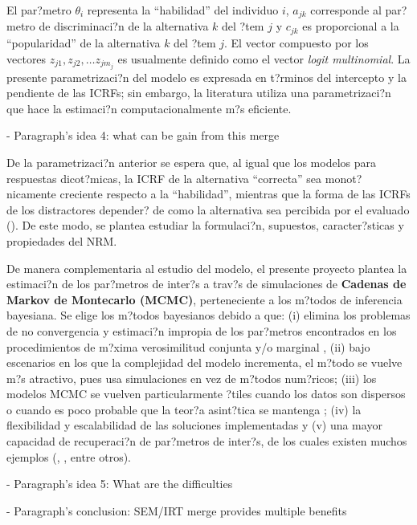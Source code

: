 El par?metro $\theta_i$ representa la ``habilidad'' del individuo $i$, $a_{jk}$ corresponde al par?metro de discriminaci?n de la alternativa $k$ del ?tem $j$ y $c_{jk}$ es proporcional a la ``popularidad'' de la alternativa $k$ del ?tem $j$. El vector compuesto por los vectores $z_{j1}, z_{j2}, \dots z_{j m_j}$ es usualmente definido como el vector \textit{logit multinomial}. La presente parametrizaci?n del modelo es expresada en t?rminos del intercepto y la pendiente de las ICRFs; sin embargo, la literatura utiliza una parametrizaci?n que hace la estimaci?n computacionalmente m?s eficiente.



- Paragraph's idea 4: what can be gain from this merge

De la parametrizaci?n anterior se espera que, al igual que los modelos para respuestas dicot?micas, la ICRF de la alternativa ``correcta'' sea monot?nicamente creciente respecto a la ``habilidad'', mientras que la forma de las ICRFs de los distractores depender? de como la alternativa sea percibida por el evaluado (\citealp{Ham_Swam1991}). De este modo, se plantea estudiar la formulaci?n, supuestos, caracter?sticas y propiedades del NRM.

De manera complementaria al estudio del modelo, el presente proyecto plantea la estimaci?n de los par?metros de inter?s a trav?s de simulaciones de \textbf{Cadenas de Markov de Montecarlo (MCMC)}, perteneciente a los m?todos de inferencia bayesiana. Se elige los m?todos bayesianos debido a que: (i) elimina los problemas de no convergencia y estimaci?n impropia de los par?metros encontrados en los procedimientos de m?xima verosimilitud conjunta y/o marginal \citep{Ham_Swam_Rog1991}, (ii) bajo escenarios en los que la complejidad del modelo incrementa, el m?todo se vuelve m?s atractivo, pues usa simulaciones en vez de m?todos num?ricos; (iii) los modelos MCMC se vuelven particularmente ?tiles cuando los datos son dispersos o cuando es poco probable que la teor?a asint?tica se mantenga \citep{Fox2010}; (iv) la flexibilidad y escalabilidad de las soluciones implementadas y (v) una mayor capacidad de recuperaci?n de par?metros de inter?s, de los cuales existen muchos ejemplos (\citealp{Hsi_Proc_Hou_Teo2010}, \citealp{Tarazona2013}, entre otros).


- Paragraph's idea 5: What are the difficulties


- Paragraph's conclusion: SEM/IRT merge provides multiple benefits




